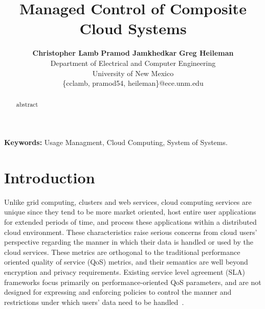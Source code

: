 \documentclass[times, 10pt,twocolumn]{article}
\begin{document}
%
\title{Managed Control of Composite Cloud Systems}



\author{
        \textbf{Christopher Lamb}\hspace*{0.3in}
        \textbf{Pramod Jamkhedkar}\hspace*{0.3in}
        \textbf{Greg Heileman}\\
        Department of Electrical and Computer Engineering \\
        University of New Mexico \\
        \small{\{cclamb, pramod54, heileman\}@ece.unm.edu}
}

\maketitle
\thispagestyle{empty}

\begin{abstract}
abstract
\end{abstract}

\textbf{Keywords:} Usage Managment, Cloud Computing, System of Systems.



\section{Introduction}
Unlike grid computing, clusters and web services, cloud computing services are unique since they tend to be more market oriented, host entire user applications for extended periods of time, and process these applications within a distributed cloud environment. These characteristics raise serious concerns from cloud users' perspective regarding the manner in which their data is handled or used by the cloud services. These metrics are orthogonal to the traditional performance oriented quality of service (QoS) metrics, and their semantics are well beyond encryption and privacy requirements. Existing service level agreement (SLA) frameworks focus primarily on performance-oriented QoS parameters, and are not designed for expressing and enforcing policies to control the manner and restrictions under which users' data need to be handled~\cite{WSA, WSLA, WSP,PaRaSh:09}. 
 
\end{document}
